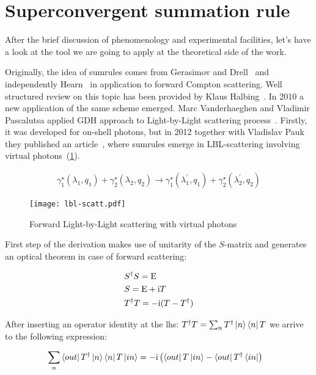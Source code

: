 \section{Superconvergent summation rule}
After the brief discussion of phenomenology and experimental facilities, let's have a look at the tool we are going to apply at the theoretical side of the work.

Originally,  the idea of sumrules comes from Gerasimov and Drell~\cite{gdh-g-orig} and independently Hearn~\cite{gdh-dh-orig} in application to forward Compton scattering. Well structured review on this topic has been provided by Klaus Halbing~\cite{gdh-helbing}. In 2010 a new application of the same scheme emerged. Marc Vanderhaeghen and Vladimir Pascalutsa applied GDH approach to Light-by-Light scattering process~\cite{lbl-sum1}. Firstly, it was developed for on-shell photons, but in 2012 together with Vladislav Pauk they published an article~\cite{lbl-sum2}, where sumrules emerge in LBL-scattering involving virtual photons~(\cref{fig:lbl-scatt}). 

\begin{align} \label{eq:lbl-scatt}
    \gamma^\star_1(\lambda_1, q_1) + \gamma^\star_2(\lambda_2, q_2) \rightarrow \gamma^\star_1(\lambda_1^\prime, q_1) + \gamma^\star_2(\lambda_2^\prime, q_2) 
\end{align}

\begin{figure}
    \centering
    \texttt{[image: lbl-scatt.pdf]}
    \caption{Forward Light-by-Light scattering with virtual photons \label{fig:lbl-scatt}}
\end{figure}

First step of the derivation makes use of unitarity of the $S$-matrix and generates an optical theorem in case of forward scattering:

\begin{align}
    & S^\dag S = \mathrm{E} \\
    & S = \mathrm{E} + \mathrm{i} T \\
    & T^\dag T = -\mathrm{i}(T - T^\dag)
\end{align}

After inserting an operator identity at the lhs: $T^\dag T = \sum_{n} T^\dag \ket{n}\bra{n} T$ we arrive to the following expression:

\begin{align}
    & \sum_{n} \bra{out} T^\dag \ket{n}\bra{n} T \ket{in} = -\mathrm{i} \left( \bra{out} T \ket{in} - \bra{out} T^\dag \bra{in} \right)
\end{align}

